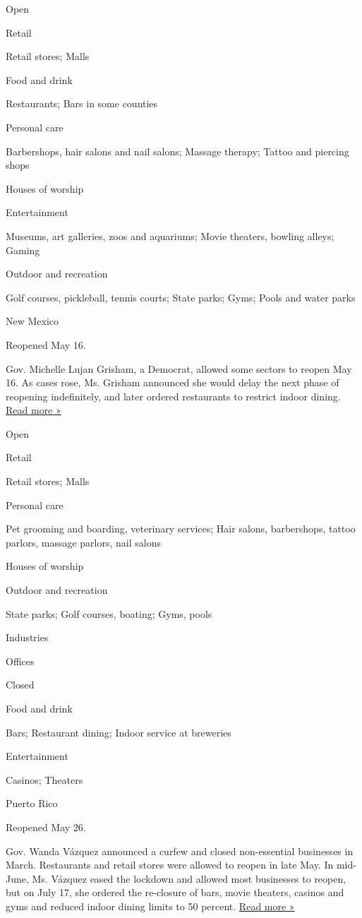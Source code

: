Open

Retail

Retail stores; Malls

Food and drink

Restaurants; Bars in some counties

Personal care

Barbershops, hair salons and nail salons; Massage therapy; Tattoo and
piercing shops

Houses of worship

Entertainment

Museums, art galleries, zoos and aquariums; Movie theaters, bowling
alleys; Gaming

Outdoor and recreation

Golf courses, pickleball, tennis courts; State parks; Gyms; Pools and
water parks

New Mexico

Reopened May 16.

Gov. Michelle Lujan Grisham, a Democrat, allowed some sectors to reopen
May 16. As cases rose, Ms. Grisham announced she would delay the next
phase of reopening indefinitely, and later ordered restaurants to
restrict indoor dining.
\href{https://www.krqe.com/health/coronavirus-new-mexico/new-mexico-indoor-dining-reopening-plans-criteria-remain-unclear/}{Read
more »}

Open

Retail

Retail stores; Malls

Personal care

Pet grooming and boarding, veterinary services; Hair salons,
barbershops, tattoo parlors, massage parlors, nail salons

Houses of worship

Outdoor and recreation

State parks; Golf courses, boating; Gyms, pools

Industries

Offices

Closed

Food and drink

Bars; Restaurant dining; Indoor service at breweries

Entertainment

Casinos; Theaters

Puerto Rico

Reopened May 26.

Gov. Wanda Vázquez announced a curfew and closed non-essential
businesses in March. Restaurants and retail stores were allowed to
reopen in late May. In mid-June, Ms. Vázquez eased the lockdown and
allowed most businesses to reopen, but on July 17, she ordered the
re-closure of bars, movie theaters, casinos and gyms and reduced indoor
dining limits to 50 percent.
\href{https://www.bloomberg.com/news/articles/2020-07-16/puerto-rico-closes-bars-movie-theaters-casinos-amid-pandemic}{Read
more »}

